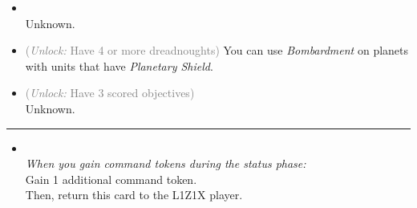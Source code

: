 \begin{multicols}{2}

\begin{itemize}
\item {}\\
Unknown.
\item {} \textcolor{gray}{(\emph{Unlock:} Have 4 or more dreadnoughts)}
You can use \emph{Bombardment} on planets with units that have \emph{Planetary Shield}.
\item {} \textcolor{gray}{(\emph{Unlock:} Have 3 scored objectives)}\\
Unknown. %
\end{itemize}

\vspace{-10pt}\rule{\hsize}{0.4pt}\vspace{5pt}


\begin{itemize}
\item {}\\
\emph{When you gain command tokens during the status phase:}\\
Gain 1 additional command token.\\
Then, return this card to the L1Z1X player.
\end{itemize}

\end{multicols}



